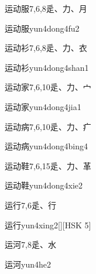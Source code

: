 \begin{entry}{运动服}{7,6,8}{⾡、⼒、⽉}
  \begin{phonetics}{运动服}{yun4dong4fu2}
  \end{phonetics}
\end{entry}

\begin{entry}{运动衫}{7,6,8}{⾡、⼒、⾐}
  \begin{phonetics}{运动衫}{yun4dong4shan1}
  \end{phonetics}
\end{entry}

\begin{entry}{运动家}{7,6,10}{⾡、⼒、⼧}
  \begin{phonetics}{运动家}{yun4dong4jia1}
  \end{phonetics}
\end{entry}

\begin{entry}{运动病}{7,6,10}{⾡、⼒、⽧}
  \begin{phonetics}{运动病}{yun4dong4bing4}
  \end{phonetics}
\end{entry}

\begin{entry}{运动鞋}{7,6,15}{⾡、⼒、⾰}
  \begin{phonetics}{运动鞋}{yun4dong4xie2}
  \end{phonetics}
\end{entry}

\begin{entry}{运行}{7,6}{⾡、⾏}
  \begin{phonetics}{运行}{yun4xing2}[][HSK 5]
  \end{phonetics}
\end{entry}

\begin{entry}{运河}{7,8}{⾡、⽔}
  \begin{phonetics}{运河}{yun4he2}
  \end{phonetics}
\end{entry}

